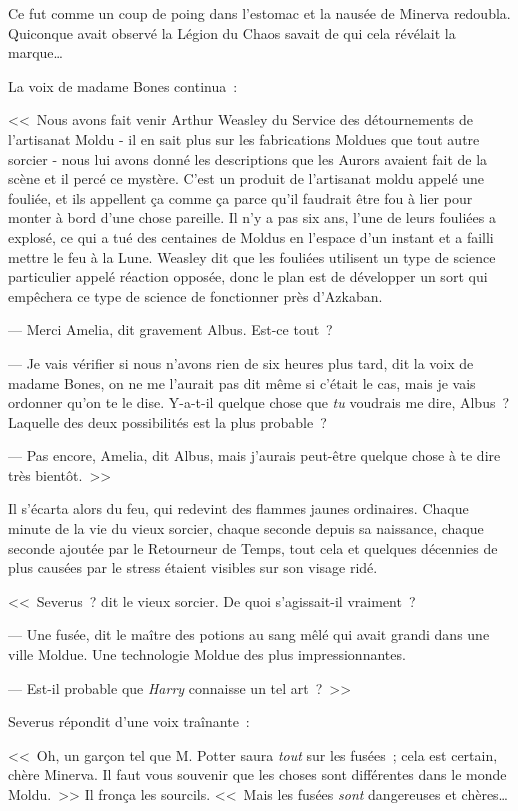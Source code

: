 Ce fut comme un coup de poing dans l'estomac et la nausée de Minerva redoubla. Quiconque avait observé la Légion du Chaos savait de qui cela révélait la marque…

La voix de madame Bones continua~:

<<~Nous avons fait venir Arthur Weasley du Service des détournements de l'artisanat Moldu - il en sait plus sur les fabrications Moldues que tout autre sorcier - nous lui avons donné les descriptions que les Aurors avaient fait de la scène et il percé ce mystère. C'est un produit de l'artisanat moldu appelé une fouliée, et ils appellent ça comme ça parce qu'il faudrait être fou à lier pour monter à bord d'une chose pareille. Il n'y a pas six ans, l'une de leurs fouliées a explosé, ce qui a tué des centaines de Moldus en l'espace d'un instant et a failli mettre le feu à la Lune. Weasley dit que les fouliées utilisent un type de science particulier appelé réaction opposée, donc le plan est de développer un sort qui empêchera ce type de science de fonctionner près d'Azkaban.

--- Merci Amelia, dit gravement Albus. Est-ce tout~?

--- Je vais vérifier si nous n'avons rien de six heures plus tard, dit la voix de madame Bones, on ne me l'aurait pas dit même si c'était le cas, mais je vais ordonner qu'on te le dise. Y-a-t-il quelque chose que \emph{tu} voudrais me dire, Albus~? Laquelle des deux possibilités est la plus probable~?

--- Pas encore, Amelia, dit Albus, mais j'aurais peut-être quelque chose à te dire très bientôt.~>>

Il s'écarta alors du feu, qui redevint des flammes jaunes ordinaires. Chaque minute de la vie du vieux sorcier, chaque seconde depuis sa naissance, chaque seconde ajoutée par le Retourneur de Temps, tout cela et quelques décennies de plus causées par le stress étaient visibles sur son visage ridé.

<<~Severus~? dit le vieux sorcier. De quoi s'agissait-il vraiment~?

--- Une fusée, dit le maître des potions au sang mêlé qui avait grandi dans une ville Moldue. Une technologie Moldue des plus impressionnantes.

--- Est-il probable que \emph{Harry} connaisse un tel art~?~>>

Severus répondit d'une voix traînante~:

<<~Oh, un garçon tel que M. Potter saura \emph{tout} sur les fusées~; cela est certain, chère Minerva. Il faut vous souvenir que les choses sont différentes dans le monde Moldu.~>> Il fronça les sourcils. <<~Mais les fusées \emph{sont} dangereuses et chères…

